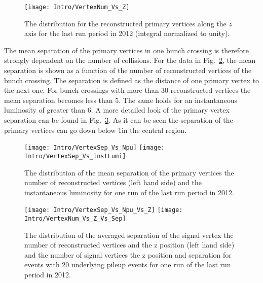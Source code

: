 \begin{figure}[Htb]
    \centering
    \texttt{[image: Intro/VertexNum\_Vs\_Z]}
    \caption[Vertex distribution along z]{The distribution for the reconstructed primary vertices along the $z$ axis for the last run period in 2012 (integral normalized to unity). \label{plot:IntroVertexPos}}
\end{figure}

The mean separation of the primary vertices in one bunch crossing is therefore strongly dependent on the number of collisions. For the data in Fig.~\ref{plot:IntroVertexSep}, the mean separation is shown as a function of the number of reconstructed vertices of the bunch crossing. The separation is defined as the distance of one primary vertex to the next one. For bunch crossings with more than 30 reconstructed vertices the mean separation becomes less than 5\mm. The same holds for an instantaneous luminosity of greater than 6\hertzpernbarn. A more detailed look of the primary vertex separation can be found in Fig.~\ref{plot:IntroVertexSep2D}. As it can be seen the separation of the primary vertices can go down below 1\mm in the central region.

\begin{figure}[Htb]
    \centering
    \texttt{[image: Intro/VertexSep\_Vs\_Npu]}
    \texttt{[image: Intro/VertexSep\_Vs\_InstLumi]}
    \caption[Mean vertex separation \vs number of reconstructed vertices and \vs instantaneous luminosity]{The distribution of the mean separation of the primary vertices \vs the number of reconstructed vertices (left hand side) and \vs the instantaneous luminosity for one run of the last run period in 2012. \label{plot:IntroVertexSep}}
\end{figure}

\begin{figure}[Htb]
    \centering
    \texttt{[image: Intro/VertexSep\_Vs\_Npu\_Vs\_Z]}
    \texttt{[image: Intro/VertexNum\_Vs\_Z\_Vs\_Sep]}
    \caption[Vertex separation \vs number of reconstructed vertices and \vs z position of the vertex. Number of signal vertices \vs z position and separation for events with 20 underlying pileup events]{The distribution of the averaged separation of the signal vertex \vs the number of reconstructed vertices and the z position (left hand side) and the number of signal vertices \vs the z position and separation for events with 20 underlying pileup events for one run of the last run period in 2012. \label{plot:IntroVertexSep2D}}
\end{figure}

